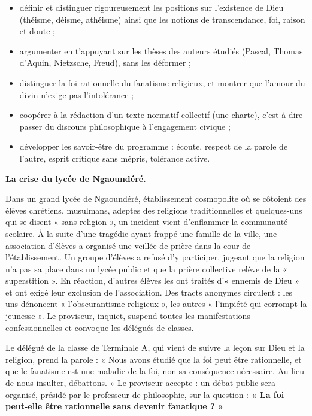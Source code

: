 \documentclass[11pt]{article}
\newcommand{\cle}[1]{{\popxbold\color{popdark}#1}}
\newcounter{popsec}
\newcounter{popsub}
\newcommand{\courssub}[1]{%
  \stepcounter{popsub}%
  \par\vspace{9pt}\noindent{\popxbold\fontsize{11.5}{13}\selectfont\color{popink}{\color{poporange}\thepopsec.\thepopsub}\hspace{6pt}#1}\par\nopagebreak\vspace{4pt}
}
\begin{document}
\begin{itemize}
  \item \cle{définir} et distinguer rigoureusement les positions sur l'existence de Dieu (théisme, déisme, athéisme) ainsi que les notions de transcendance, foi, raison et doute ;
  \item \cle{argumenter} en t'appuyant sur les thèses des auteurs étudiés (Pascal, Thomas d'Aquin, Nietzsche, Freud), sans les déformer ;
  \item \cle{distinguer} la foi rationnelle du fanatisme religieux, et montrer que l'amour du divin n'exige pas l'intolérance ;
  \item \cle{coopérer} à la rédaction d'un texte normatif collectif (une charte), c'est-à-dire passer du discours philosophique à l'engagement civique ;
  \item développer les \cle{savoir-être} du programme : écoute, respect de la parole de l'autre, esprit critique sans mépris, tolérance active.
\end{itemize}

\courssub{Situation}

\textbf{La crise du lycée de Ngaoundéré.}\par

Dans un grand lycée de Ngaoundéré, établissement cosmopolite où se côtoient des élèves chrétiens, musulmans, adeptes des religions traditionnelles et quelques-uns qui se disent « sans religion », un incident vient d'enflammer la communauté scolaire. À la suite d'une tragédie ayant frappé une famille de la ville, une association d'élèves a organisé une veillée de prière dans la cour de l'établissement. Un groupe d'élèves a refusé d'y participer, jugeant que la religion n'a pas sa place dans un lycée public et que la prière collective relève de la « superstition ». En réaction, d'autres élèves les ont traités d'« ennemis de Dieu » et ont exigé leur exclusion de l'association. Des tracts anonymes circulent : les uns dénoncent « l'obscurantisme religieux », les autres « l'impiété qui corrompt la jeunesse ». Le proviseur, inquiet, suspend toutes les manifestations confessionnelles et convoque les délégués de classes.

Le délégué de la classe de Terminale A, qui vient de suivre la leçon sur Dieu et la religion, prend la parole : « Nous avons étudié que la foi peut être rationnelle, et que le fanatisme est une maladie de la foi, non sa conséquence nécessaire. Au lieu de nous insulter, débattons. » Le proviseur accepte : un débat public sera organisé, présidé par le professeur de philosophie, sur la question : \textbf{« La foi peut-elle être rationnelle sans devenir fanatique ? »}
\end{document}
